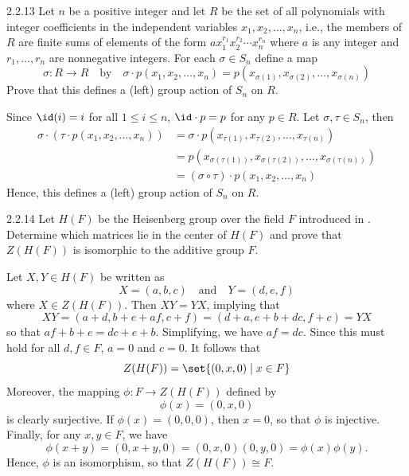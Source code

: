\begin{exercise}{2.2.13}
    Let $n$ be a positive integer and let $R$ be the set of all polynomials with integer coefficients in the independent variables $x_1, x_2, \ldots, x_n$, i.e., the members of $R$ are finite sums of elements of the form $ax_1^{r_1}x_2^{r_2} \cdots x_n^{r_n}$ where $a$ is any integer and $r_1, \ldots, r_n$ are nonnegative integers.
	For each $\sigma \in S_n$ define a map
    \[
    	\sigma : R \to R \quad \text{by} \quad \sigma \cdot p(x_1, x_2, \ldots, x_n) = p(x_{\sigma(1)}, x_{\sigma(2)}, \ldots, x_{\sigma(n)})
    \]
    Prove that this defines a (left) group action of $S_n$ on $R$.
\end{exercise}

\begin{sol}
    Since $\id(i) = i$ for all $1 \leq i \leq n$, $\id \cdot p = p$ for any $p \in R$.
	Let $\sigma, \tau \in S_n$, then
    \begin{align*}
        \sigma \cdot (\tau \cdot p(x_1, x_2, \ldots, x_n)) & = \sigma \cdot p(x_{\tau(1)}, x_{\tau(2)}, \ldots, x_{\tau(n)}) \\
        & = p(x_{\sigma(\tau(1))}, x_{\sigma(\tau(2))}, \ldots, x_{\sigma(\tau(n))}) \\
        & = (\sigma \circ \tau) \cdot p(x_1, x_2, \ldots, x_n)
    \end{align*}
    Hence, this defines a (left) group action of $S_n$ on $R$.
\end{sol}

\begin{exercise}{2.2.14}
    Let $H(F)$ be the Heisenberg group over the field $F$ introduced in .
	Determine which matrices lie in the center of $H(F)$ and prove that $Z(H(F))$ is isomorphic to the additive group $F$.
\end{exercise}

\begin{sol}
    Let $X, Y \in H(F)$ be written as
    \[
    	X = (a, b, c) \quad \text{and} \quad Y = (d, e, f)
    \]
    where $X \in Z(H(F))$.
	Then $XY = YX$, implying that
    \[
    	XY = (a + d, b + e + af, c + f) = (d + a, e + b + dc, f + c) = YX
    \]
    so that $af + b + e = dc + e + b$.
	Simplifying, we have $af = dc$.
	Since this must hold for all $d, f \in F$, $a = 0$ and $c = 0$.
	It follows that
    \[
    	Z(H(F)) = \set{(0, x, 0) \mid x \in F}
    \]
    Moreover, the mapping $\phi : F \to Z(H(F))$ defined by
    \[
    	\phi(x) = (0, x, 0)
    \]
    is clearly surjective.
	If $\phi(x) = (0, 0, 0)$, then $x = 0$, so that $\phi$ is injective.
	Finally, for any $x, y \in F$, we have
    \[
    	\phi(x + y) = (0, x + y, 0) = (0, x, 0)(0, y, 0) = \phi(x) \phi(y).
    \]
    Hence, $\phi$ is an isomorphism, so that $Z(H(F)) \cong F$.
\end{sol}